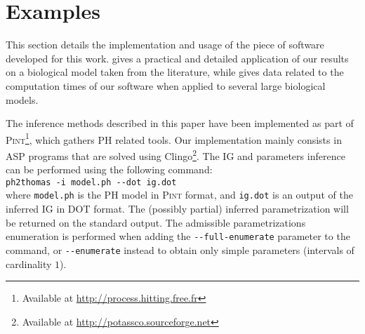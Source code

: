 \section{Examples}\label{sec:examples}


This section details the implementation and usage of the piece of software developed for this work.
 gives a practical and detailed application of our results on a biological model taken from the literature,
while  gives data related to the computation times of our software when applied to several large biological models.

\medskip

The inference methods described in this paper have been implemented as part of
\textsc{Pint}\footnote{Available at \url{http://process.hitting.free.fr}}, which gathers PH related tools.
Our implementation mainly consists in ASP programs that are solved using
Clingo\footnote{Available at \url{http://potassco.sourceforge.net}}.
The IG and parameters inference can be performed using the following command:\\
  \hspace*{1.2em}\texttt{ph2thomas -i model.ph -{}-dot ig.dot}\\
where \texttt{model.ph} is the PH model in \textsc{Pint} format,
and \texttt{ig.dot} is an output of the inferred IG in DOT format.
The (possibly partial) inferred parametrization will be returned on the standard output.
The admissible parametrizations enumeration is performed when adding the \texttt{-{}-full-enumerate} parameter to the command,
or \texttt{-{}-enumerate} instead to obtain only simple parameters (intervals of cardinality $1$).

\begin{comment}
\todo{Check this paragraph}
Applied to the example in \pref{fig:runningPH-2} where cooperations have been defined,
our method infers the IG and parametrization given in \pref{fig:runningBRN}.
Regarding the example in \pref{fig:runningPH-1}, the same IG is inferred, as well as for the
parametrization except for the parameters $K_{a,\{b\},\{c\}}$ and $K_{a,\{c\},\{b\}}$ which are
undefined (because of the lack of cooperativity between $b$ and $c$).
In such a case, this partial parametrization allows 36 admissible complete parametrizations, as two
parameters with 3 potential values could not be inferred.
If we constrain these latter parameters so that they contain exactly one element, we obtain only 9
admissible parametrizations.
\end{comment}



